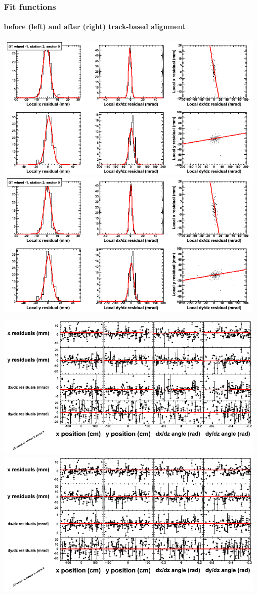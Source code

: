 \documentclass[compress]{beamer}
\begin{document}
\begin{frame}
\frametitle{Fit functions}
\framesubtitle{before (left) and after (right) track-based alignment}
\includegraphics[width=0.5\linewidth]{fitfunctions_re01/MBwhBst3sec09_bellcurves.png} \includegraphics[width=0.5\linewidth]{fitfunctions_re05/MBwhBst3sec09_bellcurves.png}

\includegraphics[width=0.5\linewidth]{fitfunctions_re01/MBwhBst3sec09_polynomials.png} \includegraphics[width=0.5\linewidth]{fitfunctions_re05/MBwhBst3sec09_polynomials.png}
\end{frame}
\end{document}
